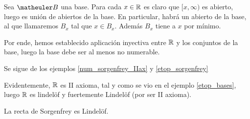 \begin{exa}[$(\R,\T_{[,)})$ no es II axioma]
	\label{num_sorgenfrey_IIax}
	Sea $\B$ una base. Para cada $x\in\mathbb{R}$ es claro que $[x,\infty)$ es abierto, luego es unión de abiertos de la base. En particular, habrá un abierto de la base, al que llamaremos $B_x$ tal que $x\in B_x$. Además $B_x$ tiene a $x$ por mínimo.
	
	Por ende, hemos establecido aplicación inyectiva entre $\mathbb{R}$ y los conjuntos de la base, luego la base debe ser al menos no numerable.
\end{exa}
\begin{obs}
	Se sigue de los ejemplos \ref{num_sorgenfrey_IIax} y \ref{etop_sorgenfrey}
\end{obs}
\begin{obs}
	\label{num_exa_lindelof_R}
	Evidentemente, $\mathbb{R}$ es II axioma, tal y como se vio en el ejemplo \ref{etop_bases}, luego $\mathbb{R}$ es lindelöf y fuertemente Lindelöf (por ser II axioma).
\end{obs}
\begin{theo}
	La recta de Sorgenfrey es Lindelöf.
\end{theo}
